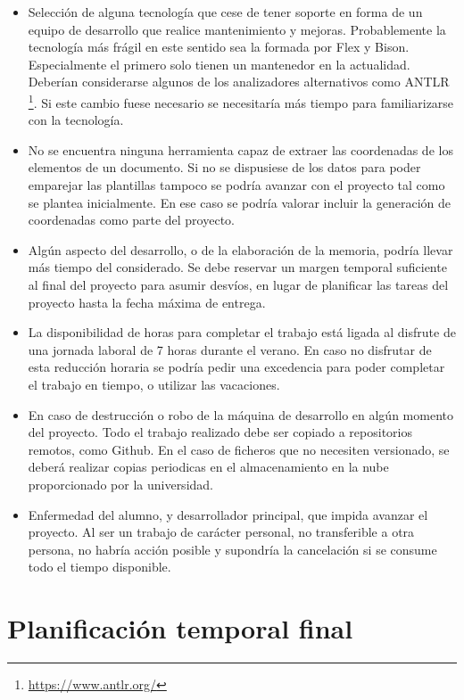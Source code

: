 \begin{itemize}
	\item Selección de alguna tecnología que cese de tener soporte en  forma de un equipo de desarrollo que realice mantenimiento y mejoras. Probablemente la tecnología más frágil en este sentido sea la formada por Flex y Bison. Especialmente el primero solo tienen un mantenedor en la actualidad. Deberían considerarse algunos de los analizadores alternativos como ANTLR \footnote{\url{https://www.antlr.org/}}. Si este cambio fuese necesario se necesitaría más tiempo para familiarizarse con la tecnología.
	\item No se encuentra ninguna herramienta capaz de extraer las coordenadas de los elementos de un documento. Si no se dispusiese de los datos para poder emparejar las plantillas tampoco se podría avanzar con el proyecto tal como se plantea inicialmente. En ese caso se podría valorar incluir la generación de coordenadas como parte del proyecto.
	\item Algún aspecto del desarrollo, o de la elaboración de la memoria, podría llevar más tiempo del considerado. Se debe reservar un margen temporal suficiente al final del proyecto para asumir desvíos, en lugar de planificar las tareas del proyecto hasta la fecha máxima de entrega.
	\item La disponibilidad de horas para completar el trabajo está ligada al disfrute de una jornada laboral de 7 horas durante el verano. En caso no disfrutar de esta reducción horaria se podría pedir una excedencia para poder completar el trabajo en tiempo, o utilizar las vacaciones.
	\item En caso de destrucción o robo de la máquina de desarrollo en algún momento del proyecto. Todo el trabajo realizado debe ser copiado a repositorios remotos, como Github. En el caso de ficheros que no necesiten versionado, se deberá realizar copias periodicas en el almacenamiento en la nube proporcionado por la universidad.
	\item Enfermedad del alumno, y desarrollador principal, que impida avanzar el proyecto. Al ser un trabajo de carácter personal, no transferible a otra persona, no habría acción posible y supondría la cancelación si se consume todo el tiempo disponible.
\end{itemize}

\section{Planificación temporal final}

